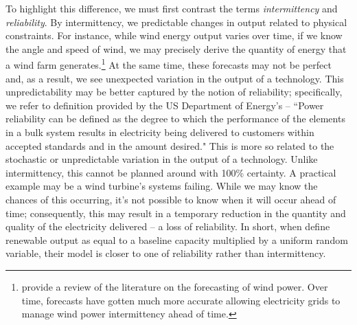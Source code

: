 \documentclass[11pt,a4paper]{extarticle}
\begin{document}
To highlight this difference, we must first contrast the terms  \textit{intermittency} and \textit{reliability}. By intermittency, we predictable changes in output related to physical constraints. For instance, while wind energy output varies over time, if  we know the angle and speed of wind, we may precisely derive the quantity of energy that a wind farm generates.\footnote{ \citet{Foley2012} provide a review of the literature on the forecasting of wind power. Over time, forecasts have gotten much more accurate allowing electricity grids to manage wind power intermittency ahead of time.}  At the same time, these forecasts may not be perfect and, as a result, we see unexpected variation in the output of a technology. This unpredictability may be better captured by the notion of reliability; specifically,  we refer to definition provided by the US Department of Energy's \citet{ORNL} -- ``Power reliability can be defined as the degree to which the performance of the elements in a bulk system results in electricity being delivered to customers within accepted standards and in the amount desired." This is more so related to the stochastic or unpredictable variation in the output of a technology. Unlike intermittency, this cannot be planned around with 100\% certainty. A practical example may be a wind turbine's systems failing. While we may know the chances of this occurring, it's not possible to know when it will occur ahead of time; consequently, this may result in a temporary reduction in the quantity and quality of the electricity delivered --  a loss of reliability. In short, when \citeauthor{HH} define renewable output as equal to a baseline capacity multiplied by a uniform random variable, their model is closer to one of reliability rather than intermittency. 
\end{document}
